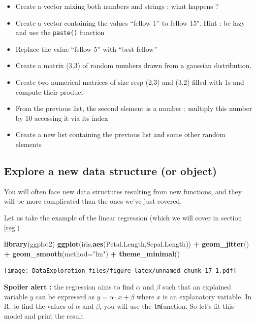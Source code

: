 \documentclass[
]{book}
\newenvironment{Shaded}{\begin{snugshade}}{\end{snugshade}}
\newcommand{\DataTypeTok}[1]{\textcolor[rgb]{0.13,0.29,0.53}{#1}}
\newcommand{\KeywordTok}[1]{\textcolor[rgb]{0.13,0.29,0.53}{\textbf{#1}}}
\newcommand{\NormalTok}[1]{#1}
\newcommand{\OperatorTok}[1]{\textcolor[rgb]{0.81,0.36,0.00}{\textbf{#1}}}
\newcommand{\StringTok}[1]{\textcolor[rgb]{0.31,0.60,0.02}{#1}}
\providecommand{\tightlist}{%
  \setlength{\itemsep}{0pt}\setlength{\parskip}{0pt}}
\begin{document}
\begin{itemize}
\tightlist
\item
  Create a vector mixing both numbers and strings : what happens ?
\item
  Create a vector containing the values ``fellow 1'' to fellow 15". Hint : be lazy and use the \texttt{paste()} function
\item
  Replace the value ``fellow 5'' with ``best fellow''
\item
  Create a matrix (3,3) of random numbers drawn from a gaussian distribution.
\item
  Create two numerical matrices of size resp (2,3) and (3,2) filled with 1s and compute their product
\item
  From the previous list, the second element is a number ; multiply this number by 10 accessing it via its index
\item
  Create a new list containing the previous list and some other random elements
\end{itemize}

\hypertarget{explore-a-new-data-structure-or-object}{%
\subsection{Explore a new data structure (or object)}\label{explore-a-new-data-structure-or-object}}

You will often face new data structures resulting from new functions, and they will be more complicated than the ones we've just covered.

Let us take the example of the linear regression (which we will cover in section \ref{reg})

\begin{Shaded}
\begin{Highlighting}[]
\KeywordTok{library}\NormalTok{(ggplot2)}
\KeywordTok{ggplot}\NormalTok{(iris,}\KeywordTok{aes}\NormalTok{(Petal.Length,Sepal.Length)) }\OperatorTok{+}\StringTok{ }\KeywordTok{geom_jitter}\NormalTok{() }\OperatorTok{+}\StringTok{ }
\StringTok{  }\KeywordTok{geom_smooth}\NormalTok{(}\DataTypeTok{method=}\StringTok{"lm"}\NormalTok{) }\OperatorTok{+}
\StringTok{  }\KeywordTok{theme_minimal}\NormalTok{()}
\end{Highlighting}
\end{Shaded}

\texttt{[image: DataExploration\_files/figure-latex/unnamed-chunk-17-1.pdf]}

\textbf{Spoiler alert :} the regression aims to find \(\alpha\) and \(\beta\) such that an explained variable \(y\) can be expressed as \(y = \alpha \cdot x + \beta\) where \(x\) is an explanatory variable. In R, to find the values of \(\alpha\) and \(\beta\), you will use the \texttt{lm}function. So let's fit this model and print the result
\end{document}
